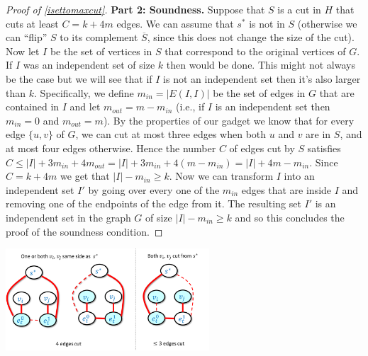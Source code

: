 \begin{proof}[Proof of \cref{isettomaxcut}]
\textbf{Part 2: Soundness.} Suppose that \(S\) is a cut in \(H\) that
cuts at least \(C=k+4m\) edges. We can assume that \(s^*\) is not in
\(S\) (otherwise we can ``flip'' \(S\) to its complement
\(\overline{S}\), since this does not change the size of the cut). Now
let \(I\) be the set of vertices in \(S\) that correspond to the
original vertices of \(G\). If \(I\) was an independent set of size
\(k\) then would be done. This might not always be the case but we will
see that if \(I\) is not an independent set then it's also larger than
\(k\). Specifically, we define \(m_{in}=|E(I,I)|\) be the set of edges
in \(G\) that are contained in \(I\) and let \(m_{out}=m-m_{in}\) (i.e.,
if \(I\) is an independent set then \(m_{in}=0\) and \(m_{out}=m\)). By
the properties of our gadget we know that for every edge \(\{u,v\}\) of
\(G\), we can cut at most three edges when both \(u\) and \(v\) are in
\(S\), and at most four edges otherwise. Hence the number \(C\) of edges
cut by \(S\) satisfies
\(C \leq |I| + 3m_{in}+4m_{out} = |I|+ 3m_{in} + 4(m-m_{in})=|I|+4m-m_{in}\).
Since \(C = k +4m\) we get that \(|I|-m_{in} \geq k\). Now we can
transform \(I\) into an independent set \(I'\) by going over every one
of the \(m_{in}\) edges that are inside \(I\) and removing one of the
endpoints of the edge from it. The resulting set \(I'\) is an
independent set in the graph \(G\) of size \(|I|-m_{in} \geq k\) and so
this concludes the proof of the soundness condition.

\end{proof}


\begin{marginfigure}
\centering
\includegraphics[width=\linewidth, height=1.5in, keepaspectratio]{../figure/iset2maxcutgadgetanalysis.png}
\caption{In the reduction of independent set to max cut, for every
\(t\in [m]\), we have a ``gadget'' corresponding to the \(t\)-th edge
\(e= \{ v_i,v_j\}\) in the original graph. If we think of the side of
the cut containing the special source vertex \(s^*\) as ``white'' and
the other side as ``blue'', then the leftmost and center figures show
that if \(v_i\) and \(v_j\) are not both blue then we can cut four edges
from the gadget. In contrast, by enumerating all possibilities one can
verify that if both \(u\) and \(v\) are blue, then no matter how we
color the intermediate vertices \(e_t^0,e_t^1\), we will cut at most
three edges from the gadget. The figure above contains only the gadget
edges and ignores the edges connecting \(s^*\) to the vertices
\(v_0,\ldots,v_{n-1}\).}
\label{ISETtoMAXCUTfig}
\end{marginfigure}


